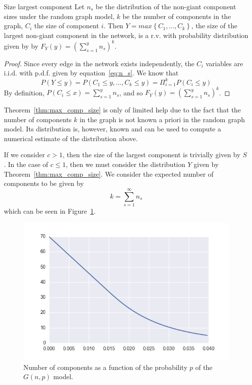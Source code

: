 \begin{theorem}{Size largest component}
\label{thm:max_comp_size}
Let $n_s$ be the distribution of the non-giant component sizes under the random graph model, $k$ be the number of components in the graph, $C_i$ the size of component $i$.
Then $Y=max\left\{ C_1,\ldots,C_k\right\}$, the size of the largest non-giant component in the network, is a r.v. with probability distribution given by
by $F_Y(y) = (\sum_{s=1}^{y} n_s)^k$.
\end{theorem}
\begin{proof}
Since every edge in the network exists independently, the $C_i$ variables are i.i.d. with p.d.f. given by equation~\ref{eq:n_s}.
We know that 
$$P(Y\le y) = P (C_1 \le y, \ldots , C_k \le y) = \Pi_{i=1}^{k} P(C_i \le y)$$
By definition, $P(C_i \le x) = \sum_{s=1}^y n_s$, and so $F_Y(y) = \left( \sum_{s=1}^y n_s \right)^k$.
\end{proof}
\vspace{0.3cm}
\begin{remark}
Theorem~\vref{thm:max_comp_size} is only of limited help due to the fact that the number of components $k$ in the graph is not known a priori in the random graph model.
Its distribution is, however, known and can be used to compute a numerical estimate of the distribution above.
\end{remark}



If we consider $c > 1$, then the size of the largest component is trivially given by $S$.
In the case of $c \le 1$, then we must consider the distribution $Y$ given by Theorem~\ref{thm:max_comp_size}.
We consider the expected number of components to be given by
\begin{equation}
	k = \sum_{s=1}^{\infty} n_s
\end{equation}
which can be seen in Figure~\ref{fig:gnp_number_components}.
\begin{figure}[hb]
	\centering
	\includegraphics[scale=0.8]{figures/gnp_number_components.png}
	\caption{Number of components as a function of the probability $p$ of the $G(n,p)$ model.}
	\label{fig:gnp_number_components}
\end{figure}

